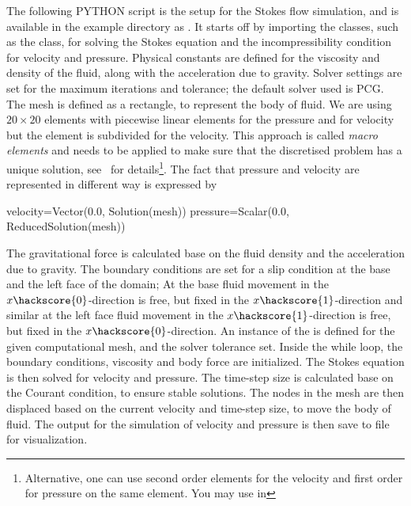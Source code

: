 The following PYTHON script is the setup for the Stokes flow simulation, and is available in the example directory as . It starts off by importing the classes, such as the  class, for solving the Stokes equation and the incompressibility condition for velocity and pressure. Physical constants are defined for the viscosity and density of the fluid, along with the acceleration due to gravity. Solver settings are set for the maximum iterations and tolerance; the default solver used is PCG. The mesh is defined as a rectangle, to represent the body of fluid. We are using $20 \times 20$ elements with piecewise linear elements for the pressure and
for velocity but the element is subdivided for the velocity. This approach is called \textit{macro elements} and needs to be applied to make sure that the discretised problem has a unique 
solution, see~\cite{LBB} for details\footnote{Alternative, one can use second order elements for the velocity and first order for pressure on the same element. You may use  in }. The fact that pressure and velocity are represented in different way is expressed by
\begin{python}
velocity=Vector(0.0, Solution(mesh))
pressure=Scalar(0.0, ReducedSolution(mesh))
\end{python}
The gravitational force is calculated base on the fluid density and the acceleration due to gravity. The boundary conditions are set for a slip condition at the base and the left face of the domain; At the base fluid movement in the $x\hackscore{0}$-direction is free, but fixed in the $x\hackscore{1}$-direction and
similar at the left face fluid movement in the $x\hackscore{1}$-direction is free, but fixed in the $x\hackscore{0}$-direction. An instance of the  is defined for the given computational mesh, and the solver tolerance set. Inside the while loop, the boundary conditions, viscosity and body force are initialized. The Stokes equation is then solved for velocity and pressure. The time-step size is calculated base on the Courant condition, to ensure stable solutions. The nodes in the mesh are then displaced based on the current velocity and time-step size, to move the body of fluid. The output for the simulation of velocity and pressure is then save to file for visualization. 
%
